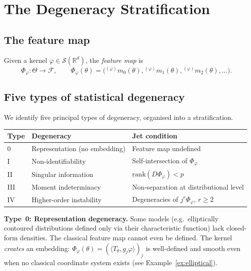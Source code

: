 \documentclass[11pt,a4paper]{article}
\newcommand{\R}{\mathbb{R}}
\newcommand{\cS}{\mathcal{S}}
\newcommand{\wm}[1]{{}^{(\varphi)}\!m_{#1}}
\begin{document}
\section{The Degeneracy Stratification}
\label{sec:degeneracies}

\subsection{The feature map}

Given a kernel $\varphi\in\cS(\R^d)$, the \emph{feature map} is
\begin{equation}\label{eq:feature_map}
  \Phi_\varphi:\Theta\to\mathcal{F},
  \qquad
  \Phi_\varphi(\theta)
  = \bigl(\wm{0}(\theta), \wm{1}(\theta), \wm{2}(\theta),
  \ldots\bigr).
\end{equation}

\subsection{Five types of statistical degeneracy}

We identify five principal types of degeneracy, organised into a
stratification.

\begin{center}
\begin{tabular}{lll}
\toprule
\textbf{Type} & \textbf{Degeneracy} & \textbf{Jet condition} \\
\midrule
0 & Representation (no embedding) & Feature map undefined \\
I & Non-identifiability & Self-intersection of $\Phi_\varphi$ \\
II & Singular information & $\mathrm{rank}(D\Phi_\varphi) < p$ \\
III & Moment indeterminacy & Non-separation at distributional level \\
IV & Higher-order instability & Degeneracies of $j^r\Phi_\varphi$,
  $r\ge 2$ \\
\bottomrule
\end{tabular}
\end{center}

\medskip

\textbf{Type~0: Representation degeneracy.}
Some models (e.g.\ elliptically contoured distributions defined only
via their characteristic function) lack closed-form densities.  The
classical feature map cannot even be defined.  The kernel
\emph{creates} an embedding:
$\Phi_\varphi(\theta) = (\langle T_\theta, g_j\varphi\rangle)_j$
is well-defined and smooth even when no classical coordinate system
exists (see Example~\ref{ex:elliptical}).
\end{document}
